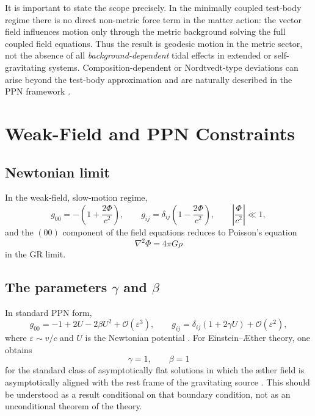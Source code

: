 \documentclass[12pt,a4paper]{article}
\newcommand{\AEther}{\AE{}ther}
\begin{document}
        It is important to state the scope precisely. In the minimally coupled
        test-body regime there is no direct non-metric force term in the matter action:
        the vector field influences motion only through the metric background solving the
        full coupled field equations. Thus the result is geodesic motion in the metric
        sector, not the absence of all \emph{background-dependent} tidal effects in
        extended or self-gravitating systems. Composition-dependent or
        Nordtvedt-type deviations can arise beyond the test-body approximation and are
        naturally described in the PPN framework \citep{foster2006,will2014}.
    
    \section{Weak-Field and PPN Constraints}
        \label{sec:obs}
        
        \subsection{Newtonian limit}
            
            In the weak-field, slow-motion regime,
            \begin{equation}
                g_{00} = -\left(1+\frac{2\Phi}{c^2}\right),
                \qquad
                g_{ij} = \delta_{ij}\left(1-\frac{2\Phi}{c^2}\right),
                \qquad
                \left|\frac{\Phi}{c^2}\right|\ll 1,
            \end{equation}
            and the $(00)$ component of the field equations reduces to Poisson's equation
            \begin{equation}
                \nabla^2 \Phi = 4\pi G \rho
            \end{equation}
            in the GR limit.
        
        \subsection{The parameters $\gamma$ and $\beta$}
            
            In standard PPN form,
            \begin{equation}
                g_{00} = -1 + 2U - 2\beta U^2 + \mathcal O(\varepsilon^3),
                \qquad
                g_{ij} = \delta_{ij}(1+2\gamma U) + \mathcal O(\varepsilon^2),
            \end{equation}
            where $\varepsilon\sim v/c$ and $U$ is the Newtonian potential
            \citep{will1993,will2014}. For Einstein--\AEther{} theory, one obtains
            \begin{equation}
                \gamma=1,\qquad \beta=1
            \end{equation}
            for the standard class of asymptotically flat solutions in which the æther field
            is asymptotically aligned with the rest frame of the gravitating source
            \citep{foster2006}. This should be understood as a result conditional on that
            boundary condition, not as an unconditional theorem of the theory.
        
\end{document}
